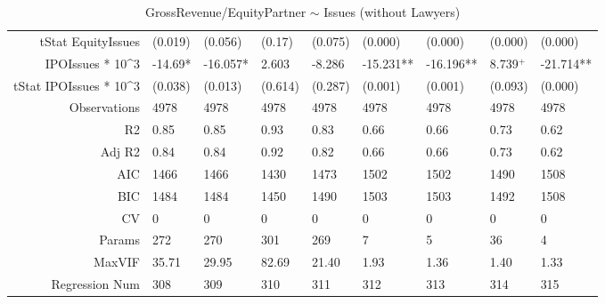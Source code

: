 \begin{table}[ht]
\begin{tabular}{rllllllll}
  tStat EquityIssues & (0.019) & (0.056) & (0.17) & (0.075) & (0.000) & (0.000) & (0.000) & (0.000) \\ 
  IPOIssues * 10^3 & -14.69* & -16.057* & 2.603 & -8.286 & -15.231** & -16.196** & 8.739$^{+}$ & -21.714** \\ 
  tStat IPOIssues * 10^3 & (0.038) & (0.013) & (0.614) & (0.287) & (0.001) & (0.001) & (0.093) & (0.000) \\ 
  Observations & 4978 & 4978 & 4978 & 4978 & 4978 & 4978 & 4978 & 4978 \\ 
  R2 & 0.85 & 0.85 & 0.93 & 0.83 & 0.66 & 0.66 & 0.73 & 0.62 \\ 
  Adj R2 & 0.84 & 0.84 & 0.92 & 0.82 & 0.66 & 0.66 & 0.73 & 0.62 \\ 
  AIC & 1466 & 1466 & 1430 & 1473 & 1502 & 1502 & 1490 & 1508 \\ 
  BIC & 1484 & 1484 & 1450 & 1490 & 1503 & 1503 & 1492 & 1508 \\ 
  CV & 0 & 0 & 0 & 0 & 0 & 0 & 0 & 0 \\ 
  Params & 272 & 270 & 301 & 269 & 7 & 5 & 36 & 4 \\ 
  MaxVIF & 35.71 & 29.95 & 82.69 & 21.40 & 1.93 & 1.36 & 1.40 & 1.33 \\ 
  Regression Num & 308 & 309 & 310 & 311 & 312 & 313 & 314 & 315 \\ 
   \hline
\end{tabular}
\caption{GrossRevenue/EquityPartner $\sim$ Issues (without Lawyers)} 
\end{table}
